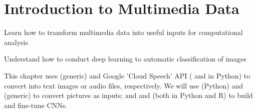 \chapter{Introduction to Multimedia Data}
\label{chap:image}

\begin{abstract}{Abstract}
Digitally collected data often does not only contain texts, but also audio, images and videos. Instead of using only textual features as we did in previous chapters, we could as well use, for instance, pixel values
to analyse images. First, we will see how to use existing libraries, commercial services or API's to conduct multimedia analysis (i.e. optical character recognition, speech-to-text or object recognition). Then we will show how to store, represent and convert image data in order to use it as an input in our computational analysis.  We will focus on image analysis using machine learning classification techniques based on deep learning, and will explain how to build (or fine-tune) a Convolutional Neural Network (CNN) by ourselves. 
\end{abstract}


\begin{objectives}
\item Learn how to transform multimedia data into useful inputs for computational analysis
\item Understand how to conduct deep learning to automatic classification of images
\end{objectives}

\begin{feature}
This chapter uses  (generic) and  Google 'Cloud Speech' API ( and  in Python) to convert into text images or audio files, respectively. We will use  (Python) and  (generic) to convert pictures as inputs; and  and  (both in Python and R) to build and fine-tune CNNs. 
\end{feature}





